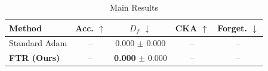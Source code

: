 \begin{table}[t]
\centering
\caption{Main Results}
\label{tab:main_results}
\begin{tabular}{lcccc}
\toprule
Method & Acc. $\uparrow$ & $D_f$ $\downarrow$ & CKA $\uparrow$ & Forget. $\downarrow$ \\
\midrule
Standard Adam & -- & 0.000 $\pm$ 0.000 & -- & -- \\
\textbf{FTR (Ours)} & -- & \textbf{0.000} $\pm$ 0.000 & -- & -- \\
\bottomrule
\end{tabular}
\end{table}